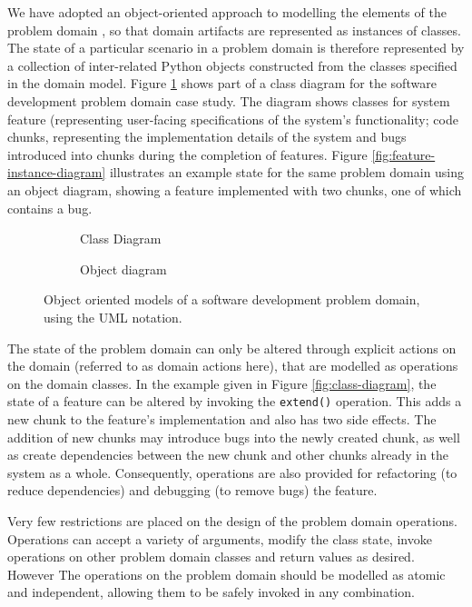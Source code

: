 \documentclass{sig-alternate}
\begin{document}
We have adopted an object-oriented approach to modelling the elements of the
problem domain \citep{UMLtextbook}, so that domain artifacts are represented as
instances of classes.  The state of a particular scenario in a problem domain is
therefore represented by a collection of inter-related Python objects
constructed from the classes specified in the domain model.  Figure
\ref{fig:feature-class-diagram} shows part of a class diagram for the software
development problem domain case study.  The diagram shows classes for system
feature (representing user-facing specifications of the system's functionality;
code chunks, representing the implementation details of the system and bugs
introduced into chunks during the completion of features.  Figure
\ref{fig:feature-instance-diagram} illustrates an example state for the same
problem domain using an object diagram, showing a feature implemented with two
chunks, one of which contains a bug.

\begin{figure}
  \centering

  \begin{subfigure}{\linewidth}
    
    \caption{Class Diagram}
  \end{subfigure}

  \begin{subfigure}{\linewidth}
    
    \caption{Object diagram}
  \end{subfigure}

  
  \caption{Object oriented models of a software development problem domain,
    using the UML notation.}
  \label{fig:feature-class-diagram}
\end{figure}

The state of the problem domain can only be altered through explicit actions on
the domain (referred to as domain actions here), that are modelled as operations
on the domain classes.  In the example given in Figure \ref{fig:class-diagram},
the state of a feature can be altered by invoking the \lstinline!extend()!
operation.  This adds a new chunk to the feature's implementation and also has
two side effects. The addition of new chunks may introduce bugs into the newly
created chunk, as well as create dependencies between the new chunk and other
chunks already in the system as a whole.  Consequently, operations are also
provided for refactoring (to reduce dependencies) and debugging (to remove bugs)
the feature.

Very few restrictions are placed on the design of the problem domain operations.
Operations can accept a variety of arguments, modify the class state, invoke
operations on other problem domain classes and return values as desired.
However The operations on the problem domain should be modelled as atomic and
independent, allowing them to be safely invoked in any combination.
\end{document}
